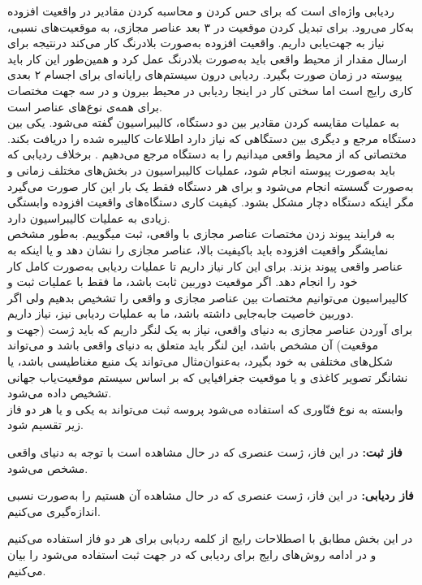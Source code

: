 ردیابی واژه‌ای است که برای حس کردن و محاسبه کردن مقادیر در واقعیت افزوده به‌کار می‌رود. برای تبدیل کردن موقعیت در ۳ بعد عناصر مجازی، به موقعیت‌های نسبی، نیاز به جهت‌یابی داریم. واقعیت افزوده به‌صورت بلادرنگ کار می‌کند درنتیجه برای ارسال مقدار از محیط واقعی باید به‌صورت بلادرنگ عمل کرد و همین‌طور این کار باید پیوسته در زمان صورت بگیرد. ردیابی درون سیستم‌های رایانه‌ای برای اجسام ۲ بعدی کاری رایج است اما سختی کار در اینجا ردیابی در محیط بیرون و در سه جهت مختصات برای همه‌ی نوع‌های عناصر است\cite{siltanen2012theory}.
\\
به عملیات مقایسه کردن مقادیر بین دو دستگاه، کالیبراسیون گفته می‌شود. یکی بین دستگاه مرجع و دیگری بین دستگاهی که نیاز دارد اطلاعات کالیبره شده را دریافت بکند. مختصاتی که از محیط واقعی میدانیم را به دستگاه مرجع می‌دهیم  . برخلاف ردیابی که باید به‌صورت پیوسته انجام شود، عملیات کالیبراسیون در بخش‌های مختلف زمانی و به‌صورت گسسته انجام می‌شود و برای هر دستگاه فقط یک بار این کار صورت می‌گیرد مگر اینکه دستگاه دچار مشکل بشود. کیفیت کاری دستگاه‌های واقعیت افزوده وابستگی زیادی به عملیات کالیبراسیون دارد\cite{siltanen2012theory}.
\\
به فرایند پیوند زدن مختصات عناصر مجازی با واقعی، ثبت میگوییم. به‌طور مشخص نمایشگر واقعیت افزوده باید باکیفیت بالا، عناصر مجازی را نشان دهد و یا اینکه به عناصر واقعی پیوند بزند. برای این کار نیاز داریم تا عملیات ردیابی به‌صورت کامل کار خود را انجام دهد. اگر موقعیت دوربین ثابت باشد، ما فقط با عملیات ثبت و کالیبراسیون می‌توانیم مختصات بین عناصر مجازی و واقعی را تشخیص بدهیم ولی اگر دوربین خاصیت جابه‌جایی داشته باشد، ما به عملیات ردیابی نیز، نیاز داریم\cite{siltanen2012theory}.
\\برای آوردن عناصر مجازی به دنیای واقعی، نیاز به یک لنگر داریم که باید ژست (جهت و موقعیت) آن مشخص باشد، این لنگر باید متعلق به دنیای واقعی باشد و می‌تواند شکل‌های مختلفی به خود بگیرد، به‌عنوان‌مثال می‌تواند یک منبع مغناطیسی باشد، یا نشانگر تصویر کاغذی و یا موقعیت جغرافیایی که بر اساس سیستم موقعیت‌یاب جهانی تشخیص داده می‌شود.
\\
وابسته به نوع فنّاوری که استفاده می‌شود پروسه ثبت می‌تواند به یکی و یا هر دو فاز زیر تقسیم شود.


\textbf{فاز ثبت:}
در این فاز، ژست عنصری که در حال مشاهده است با توجه به دنیای واقعی مشخص می‌شود.

\textbf{فاز ردیابی:}
در این فاز، ژست عنصری که در حال مشاهده آن هستیم را به‌صورت نسبی اندازه‌گیری می‌کنیم.

در این بخش مطابق با اصطلاحات رایج از کلمه ردیابی برای هر دو فاز استفاده می‌کنیم و در ادامه روش‌های رایج برای ردیابی که در جهت ثبت استفاده می‌شود را بیان می‌کنیم.
